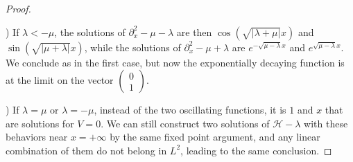 \documentclass[10pt,a4paper]{amsart}
\begin{document}
\begin{proof}
  \
  
)  If $\lambda < - \mu$, the solutions of $\partial_x^2 - \mu - \lambda$ are then
  $\cos \left( \sqrt{| \lambda + \mu |} x \right)$ and $\sin
  \left( \sqrt{| \mu + \lambda |} x \right)$, while the solutions of $\partial_x^2 -
  \mu + \lambda$ are $e^{-\sqrt{\mu -  \lambda } x}$
  and $e^{\sqrt{\mu -  \lambda } x}$. We conclude
  as in the first case, but now the exponentially decaying function is at the limit on the
  vector $\left(\begin{array}{c}
    0\\
    1
  \end{array}\right)$.

) If $\lambda = \mu$ or $\lambda = - \mu$, instead of the two oscillating functions, it is $1$ and $x$ that are solutions for $V=0$. We can still construct two solutions of $\mathcal{H}-\lambda$ with these behaviors near $x = +\infty$ by the same fixed point argument, and any linear combination of them do not belong in $L^2$, leading to the same conclusion.
  
\end{proof}
\end{document}
